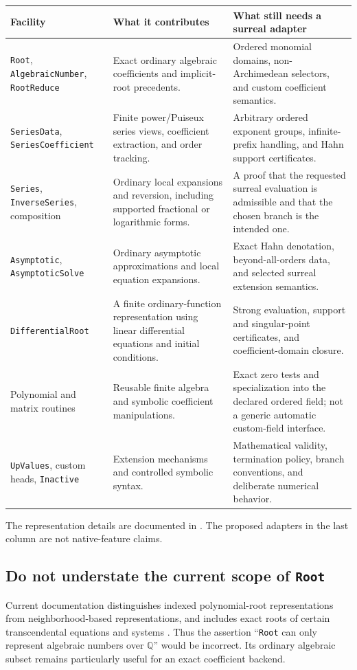\documentclass[11pt,letterpaper]{article}
\numberwithin{equation}{section}
\theoremstyle{definition}
\theoremstyle{remark}\newtheorem{remark}[theorem]{Remark}
\newcommand{\Q}{\mathbb Q}
\begin{document}
\begin{longtable}{@{}P{0.24\textwidth}P{0.33\textwidth}P{0.35\textwidth}@{}}
\toprule
Facility & What it contributes & What still needs a surreal adapter\\
\midrule\endhead
\texttt{Root}, \texttt{AlgebraicNumber}, \texttt{RootReduce} & Exact ordinary
algebraic coefficients and implicit-root precedents. & Ordered monomial
domains, non-Archimedean selectors, and custom coefficient semantics.\\[0.5em]
\texttt{SeriesData}, \texttt{SeriesCoefficient} & Finite power/Puiseux series
views, coefficient extraction, and order tracking. & Arbitrary ordered
exponent groups, infinite-prefix handling, and Hahn support certificates.\\[0.5em]
\texttt{Series}, \texttt{InverseSeries}, composition & Ordinary local
expansions and reversion, including supported fractional or logarithmic
forms. & A proof that the requested surreal evaluation is admissible and
that the chosen branch is the intended one.\\[0.5em]
\texttt{Asymptotic}, \texttt{AsymptoticSolve} & Ordinary asymptotic
approximations and local equation expansions. & Exact Hahn denotation,
beyond-all-orders data, and selected surreal extension semantics.\\[0.5em]
\texttt{DifferentialRoot} & A finite ordinary-function representation using
linear differential equations and initial conditions. & Strong evaluation,
support and singular-point certificates, and coefficient-domain closure.\\[0.5em]
Polynomial and matrix routines & Reusable finite algebra and symbolic
coefficient manipulations. & Exact zero tests and specialization into the
declared ordered field; not a generic automatic custom-field interface.\\[0.5em]
\texttt{UpValues}, custom heads, \texttt{Inactive} & Extension mechanisms and
controlled symbolic syntax. & Mathematical validity, termination policy,
branch conventions, and deliberate numerical behavior.\\
\bottomrule
\end{longtable}
The representation details are documented in
\cite{WLRoot,WLAlgebraic,WLRootReduce,WLSeriesData,WLSeriesCoefficient,WLSeries,
WLInverseSeries,WLAsymptotic,WLAsymptoticSolve,WLDifferentialRoot,
WLUpValues,WLInactive}. The proposed adapters in the last column are not
native-feature claims.

\subsection{Do not understate the current scope of \texttt{Root}}
Current documentation distinguishes indexed polynomial-root representations
from neighborhood-based representations, and includes exact roots of certain
transcendental equations and systems \cite{WLRoot}. Thus the assertion
``\texttt{Root} can only represent algebraic numbers over $\Q$'' would be
incorrect. Its ordinary algebraic subset remains particularly useful for an
exact coefficient backend.
\end{document}
